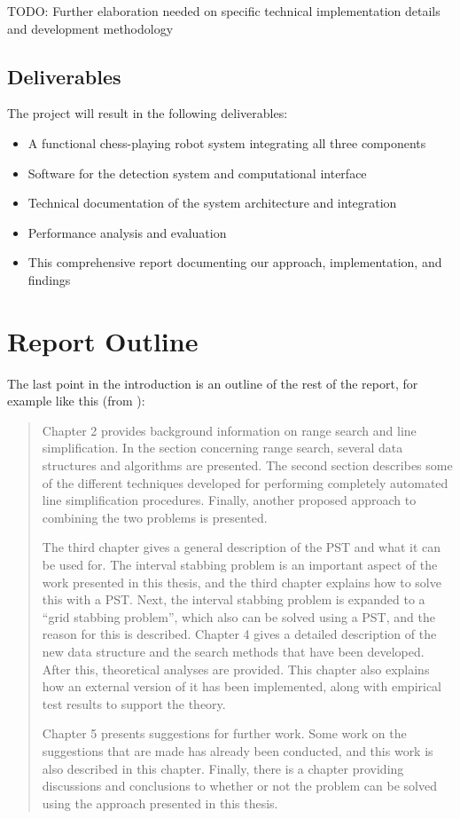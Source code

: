 TODO:  Further elaboration needed on specific technical implementation details and development methodology

\subsection{Deliverables}
\label{sec:deliverables}

The project will result in the following deliverables:
\begin{itemize}
  \item A functional chess-playing robot system integrating all three components
  \item Software for the detection system and computational interface
  \item Technical documentation of the system architecture and integration
  \item Performance analysis and evaluation
  \item This comprehensive report documenting our approach, implementation, and findings
\end{itemize}

\section{Report Outline}
\label{sec:outline}

The last point in the introduction is an outline of the rest of the report, for example like this (from \cite{kjeldsen05cor}):

\begin{quotation}
  Chapter 2 provides background information on range search and line simplification. In the section concerning range search, several data structures and algorithms are presented. The second section describes some of the different techniques developed for performing completely automated line simplification procedures. Finally, another proposed approach to combining the two problems is presented.

  The third chapter gives a general description of the PST and what it can be used for. The interval
  stabbing problem is an important aspect of the work presented in this thesis, and the third chapter
  explains how to solve this with a PST. Next, the interval stabbing problem is expanded to a ``grid
  stabbing problem”, which also can be solved using a PST, and the reason for this is described. Chapter 4 gives a detailed description of the new data structure and the search methods that
  have been developed. After this, theoretical analyses are provided. This chapter also explains how
  an external version of it has been implemented, along with empirical test results to support the theory.

  Chapter 5 presents suggestions for further work. Some work on the suggestions that are made has already been conducted, and this work is also described in this chapter. Finally, there is a chapter providing discussions and conclusions to whether or not the problem can be solved using the approach presented in this thesis.
\end{quotation}

